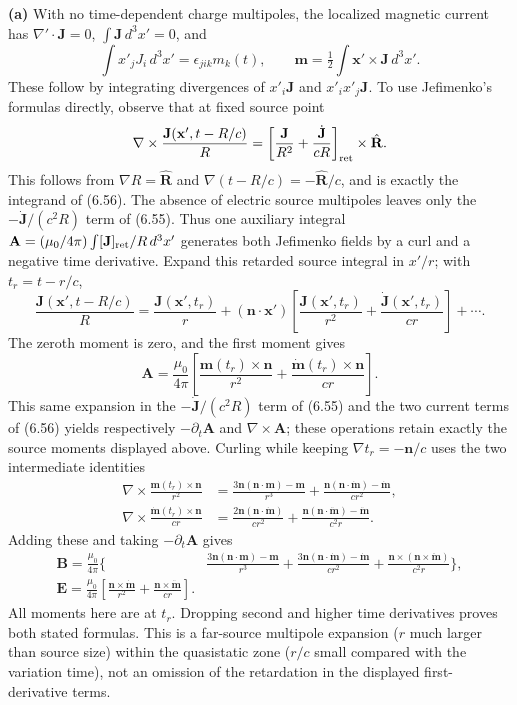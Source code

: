 \textbf{(a)} With no time-dependent charge multipoles, the localized
magnetic current has $\nabla'\cdot\mathbf J=0$, $\int\mathbf J\,d^3x'=0$,
and
\[
\int x'_jJ_i\,d^3x'=\epsilon_{jik}m_k(t),\qquad
\mathbf m=\tfrac12\int\mathbf x'\times\mathbf J\,d^3x'.
\]
These follow by integrating divergences of $x'_i\mathbf J$ and
$x'_ix'_j\mathbf J$. To use Jefimenko's formulas directly, observe that
at fixed source point
\[
\nabla\times\frac{\mathbf J(\mathbf x',t-R/c)}R
=\left[\frac{\mathbf J}{R^2}+\frac{\dot{\mathbf J}}{cR}\right]_{\rm ret}
\times\hat{\mathbf R}.
\]
This follows from $\nabla R=\hat{\mathbf R}$ and
$\nabla(t-R/c)=-\hat{\mathbf R}/c$, and is exactly the integrand of
(6.56). The absence of electric source multipoles leaves only the
$-\dot{\mathbf J}/(c^2R)$ term of (6.55). Thus one auxiliary integral
$\mathbf A=(\mu_0/4\pi)\int[\mathbf J]_{\rm ret}/R\,d^3x'$ generates
both Jefimenko fields by a curl and a negative time derivative.
Expand this retarded source integral in $x'/r$;
with $t_r=t-r/c$,
\[
\frac{\mathbf J(\mathbf x',t-R/c)}R
=\frac{\mathbf J(\mathbf x',t_r)}r
+(\mathbf n\cdot\mathbf x')\left[
\frac{\mathbf J(\mathbf x',t_r)}{r^2}
+\frac{\dot{\mathbf J}(\mathbf x',t_r)}{cr}\right]+\cdots.
\]
The zeroth moment is zero, and the first moment gives
\[
\mathbf A=\frac{\mu_0}{4\pi}\left[
\frac{\mathbf m(t_r)\times\mathbf n}{r^2}
+\frac{\dot{\mathbf m}(t_r)\times\mathbf n}{cr}\right].
\]
This same expansion in the $-\dot{\mathbf J}/(c^2R)$ term of (6.55)
and the two current terms of (6.56) yields respectively
$-\partial_t\mathbf A$ and $\nabla\times\mathbf A$; these operations
retain exactly the source moments displayed above. Curling while keeping
$\nabla t_r=-\mathbf n/c$ uses the two intermediate identities
\[
\begin{split}
\nabla\times\frac{\mathbf m(t_r)\times\mathbf n}{r^2}
&=\frac{3\mathbf n(\mathbf n\cdot\mathbf m)-\mathbf m}{r^3}
+\frac{\mathbf n(\mathbf n\cdot\dot{\mathbf m})-\dot{\mathbf m}}{cr^2},\\
\nabla\times\frac{\dot{\mathbf m}(t_r)\times\mathbf n}{cr}
&=\frac{2\mathbf n(\mathbf n\cdot\dot{\mathbf m})}{cr^2}
+\frac{\mathbf n(\mathbf n\cdot\ddot{\mathbf m})-\ddot{\mathbf m}}{c^2r}.
\end{split}
\]
Adding these and taking $-\partial_t\mathbf A$ gives
\begin{align*}
\mathbf B=\frac{\mu_0}{4\pi}\bigg\{&
\frac{3\mathbf n(\mathbf n\cdot\mathbf m)-\mathbf m}{r^3}
+\frac{3\mathbf n(\mathbf n\cdot\dot{\mathbf m})-\dot{\mathbf m}}{cr^2}
+\frac{\mathbf n\times(\mathbf n\times\ddot{\mathbf m})}{c^2r}\bigg\},\\
\mathbf E=\frac{\mu_0}{4\pi}\left[
\frac{\mathbf n\times\dot{\mathbf m}}{r^2}
+\frac{\mathbf n\times\ddot{\mathbf m}}{cr}\right].
\end{align*}
All moments here are at $t_r$. Dropping second and higher time derivatives
proves both stated formulas. This is a far-source multipole expansion
($r$ much larger than source size) within the quasistatic zone
($r/c$ small compared with the variation time), not an omission of the
retardation in the displayed first-derivative terms.


